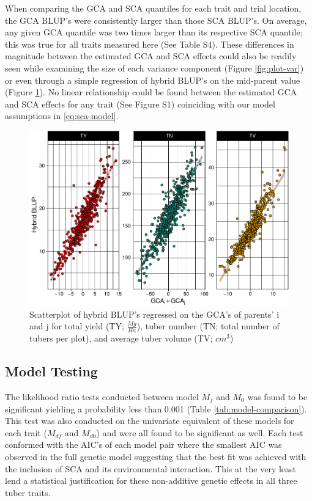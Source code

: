 When comparing the GCA and SCA quantiles for each trait and trial location, the GCA BLUP's were consistently larger than those SCA BLUP's. On average, any given GCA quantile was two times larger than its respective SCA quantile; this was true for all traits measured here (See Table S4). These differences in magnitude between the estimated GCA and SCA effects could also be readily seen while examining the size of each variance component (Figure \ref{fig:plot-var}) or even through a simple regression of hybrid BLUP's on the mid-parent value (Figure \ref{fig:bv-sca}). No linear relationship could be found between the estimated GCA and SCA effects for any trait (See Figure S1) coinciding with our model assumptions in   \eqref{eq:sca-model}.

\begin{figure}
\centering
\includegraphics[width=\linewidth]{./figs_02/Fig7.pdf}
\caption{Scatterplot of hybrid BLUP's regressed on the GCA's of parents' i and j for total yield (TY; \(\frac{Mg}{Ha}\)), tuber number (TN; total number of tubers per plot), and average tuber volume (TV; \(cm^3\))}
\label{fig:bv-sca}
\end{figure}

\subsection{Model Testing}\label{model-testing}

The likelihood ratio tests conducted between model \(M_f\) and \(M_0\) was found to be significant yielding a probability less than 0.001 (Table \ref{tab:model-comparison}). This test was also conducted on the univariate equivalent of these models for each trait (\(M_{df}\) and \(M_{d0}\)) and were all found to be significant as well. Each test conformed with the AIC's of each model pair where the smallest AIC was observed in the full genetic model suggesting that the best fit was achieved with the inclusion of SCA and its environmental interaction. This at the very least lend a statistical justification for these non-additive genetic effects in all three tuber traits.

